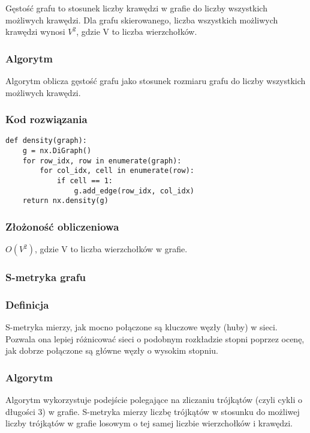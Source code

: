 \documentclass[a4paper, 12pt]{article}
\begin{document}
Gęstość grafu to stosunek liczby krawędzi w grafie do liczby wszystkich możliwych krawędzi. Dla grafu skierowanego, liczba wszystkich możliwych krawędzi wynosi \(V^2\), gdzie V to liczba wierzchołków. \cite{gestosc_grafu}

\subsubsection*{Algorytm}

Algorytm oblicza gęstość grafu jako stosunek rozmiaru grafu do liczby wszystkich
możliwych krawędzi.

\subsubsection*{Kod rozwiązania}

\begin{verbatim}
def density(graph):
    g = nx.DiGraph()
    for row_idx, row in enumerate(graph):
        for col_idx, cell in enumerate(row):
            if cell == 1:
                g.add_edge(row_idx, col_idx)
    return nx.density(g)
\end{verbatim}

\subsubsection*{Złożoność obliczeniowa}

$O(V^2)$, gdzie V to liczba wierzchołków w grafie.

\subsubsection{S-metryka grafu}

\subsubsection*{Definicja}

S-metryka mierzy, jak mocno połączone są kluczowe węzły (huby) w sieci. Pozwala ona lepiej różnicować sieci o podobnym rozkładzie stopni poprzez ocenę, jak dobrze połączone są główne węzły o wysokim stopniu. \cite{s_metryka}

\subsubsection*{Algorytm}

Algorytm wykorzystuje podejście polegające na zliczaniu trójkątów (czyli cykli o długości 3) w grafie. S-metryka mierzy liczbę trójkątów w stosunku do możliwej liczby trójkątów w grafie losowym o tej samej liczbie wierzchołków i krawędzi.
\end{document}
